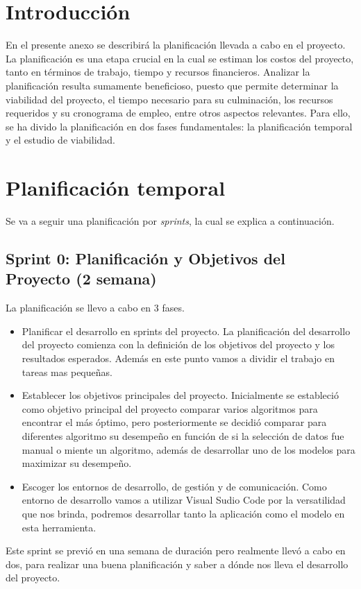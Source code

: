 
\section{Introducción}

En el presente anexo se describirá la planificación llevada a cabo en el proyecto. La planificación es una etapa crucial en la cual se estiman los costos del proyecto, tanto en términos de trabajo, tiempo y recursos financieros. Analizar la planificación resulta sumamente beneficioso, puesto que permite determinar la viabilidad del proyecto, el tiempo necesario para su culminación, los recursos requeridos y su cronograma de empleo, entre otros aspectos relevantes. Para ello, se ha divido la planificación en dos fases fundamentales: la planificación temporal y el estudio de viabilidad.

\section{Planificación temporal}

Se va a seguir una planificación por \textit{sprints}, la cual se explica a continuación.

\subsection{Sprint 0: Planificación y Objetivos del Proyecto (2 semana)}
La planificación se llevo a cabo en 3 fases.
\begin{itemize}
    \item
    Planificar el desarrollo en sprints del proyecto.
    La planificación del desarrollo del proyecto comienza con la definición de los objetivos del proyecto y los resultados esperados. Además en este punto vamos a dividir el trabajo en tareas mas pequeñas.
    \item
    Establecer los objetivos principales del proyecto.
    Inicialmente se estableció como objetivo principal del proyecto comparar varios algoritmos para encontrar el más óptimo, pero posteriormente se decidió comparar para diferentes algoritmo su desempeño en función de si la selección de datos fue manual o miente un algoritmo, además de desarrollar uno de los modelos para maximizar su desempeño.
    \item
    Escoger los entornos de desarrollo, de gestión y de comunicación.
    Como entorno de desarrollo vamos a utilizar Visual Sudio Code por la versatilidad que nos brinda, podremos desarrollar tanto la aplicación como el modelo en esta herramienta.
\end{itemize}
Este sprint se previó en una semana de duración pero realmente llevó a cabo en dos, para realizar una buena planificación y saber a dónde nos lleva el desarrollo del proyecto.


